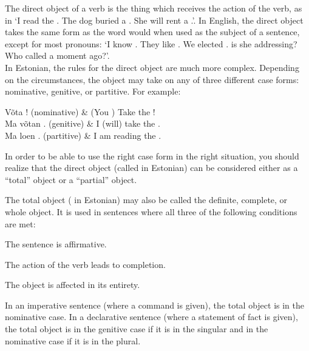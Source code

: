 \newLesson %
\label{lesson-28}

\Grammar %


\newSection \label{section-215} The direct object of a verb is the thing which receives the action of the verb, as in `I read the . The dog buried a . She will rent a .'. In English, the direct object takes the same form as the word would when used as the subject of a sentence, except for most pronouns: `I know . They like . We elected .  is she addressing? Who called  a moment ago?'. \\

In Estonian, the rules for the direct object are much more complex. Depending on the circumstances, the object may take on any of three different case forms: nominative, genitive, or partitive. For example:

	\twoColumnsTable
	Võta ! \small{(nominative)} 		& (You \sing) Take the ! \\
	Ma võtan . \small{(genitive)}  	&	I (will) take the . \\
	Ma loen . \small{(partitive)} 	&	I am reading the .
	\tableEnd

In order to be able to use the right case form in the right situation, you should realize that the direct object (called  in Estonian) can be considered either as a ``total'' object or a ``partial'' object.


\newSection \label{section-216} The total object ( in Estonian) may also be called the definite, complete, or whole object. It is used in sentences where all three of the following conditions are met:

	\enumerateBegin
	\item The sentence is affirmative.
	\item The action of the verb leads to completion.
	\item The object is affected in its entirety.
	\enumerateEnd

\newSection \label{section-217} In an imperative sentence (where a command is given), the total object is in the nominative case. In a declarative sentence (where a statement of fact is given), the total object is in the genitive case if it is in the singular and in the nominative case if it is in the plural.

